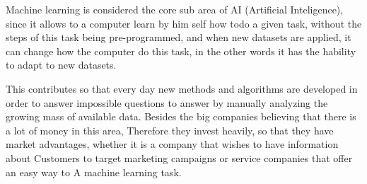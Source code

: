 Machine learning is considered the core sub area of AI (Artificial Inteligence), since it allows to a computer
learn by him self how todo a given task, without the steps of this task being pre-programmed, and when new datasets are applied, it can change how the computer do this task, in the other words it has the hability to adapt to new datasets. 
  

This contributes so that every day new methods and algorithms are developed in order to answer impossible questions to answer by manually analyzing the growing mass of available data. Besides the big companies believing that there is a lot of money in this area,
Therefore they invest heavily, so that they have market advantages, whether it is a company that wishes to have information about
Customers to target marketing campaigns or service companies that offer an easy way to
A machine learning task.
